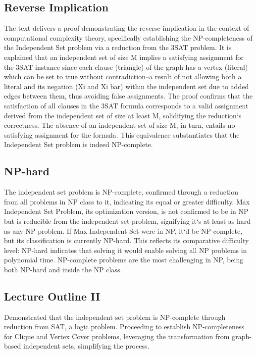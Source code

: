 \subsection*{Reverse Implication}
The text delivers a proof demonstrating the reverse implication in the context of computational complexity theory, specifically establishing the NP-completeness of the Independent Set problem via a reduction from the 3SAT problem.
It is explained that an independent set of size M implies a satisfying assignment for the 3SAT instance since each clause (triangle) of the graph has a vertex (literal) which can be set to true without contradiction--a result of not allowing both a literal and its negation (Xi and Xi bar) within the independent set due to added edges between them, thus avoiding false assignments.
The proof confirms that the satisfaction of all clauses in the 3SAT formula corresponds to a valid assignment derived from the independent set of size at least M, solidifying the reduction`s correctness.
The absence of an independent set of size M, in turn, entails no satisfying assignment for the formula.
This equivalence substantiates that the Independent Set problem is indeed NP-complete.

\subsection*{NP-hard}
The independent set problem is NP-complete, confirmed through a reduction from all problems in NP class to it, indicating its equal or greater difficulty.
Max Independent Set Problem, its optimization version, is not confirmed to be in NP but is reducible from the independent set problem, signifying it`s at least as hard as any NP problem.
If Max Independent Set were in NP, it`d be NP-complete, but its classification is currently NP-hard.
This reflects its comparative difficulty level: NP-hard indicates that solving it would enable solving all NP problems in polynomial time.
NP-complete problems are the most challenging in NP, being both NP-hard and inside the NP class.

\subsection*{Lecture Outline II}
Demonstrated that the independent set problem is NP-complete through reduction from SAT, a logic problem.
Proceeding to establish NP-completeness for Clique and Vertex Cover problems, leveraging the transformation from graph-based independent sets, simplifying the process.

